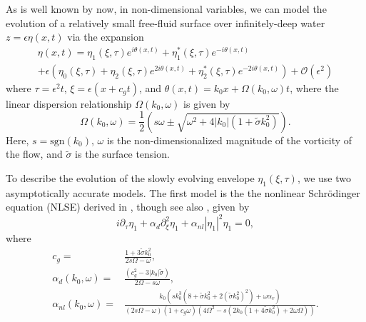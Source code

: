 \documentclass[a4paper,11pt]{article}
\newcommand{\pd}{\partial}
\begin{document}

As is well known by now, in non-dimensional variables, we can model the evolution of a relatively small free-fluid surface over infinitely-deep water $z=\epsilon \eta(x,t)$ via the expansion 
\begin{multline*}
\eta(x,t) = \eta_{1}(\xi,\tau)e^{i\theta(x,t)} + \eta^{\ast}_{1}(\xi,\tau)e^{-i\theta(x,t)}\\
+ \epsilon\left(\eta_{0}(\xi,\tau) + \eta_{2}(\xi,\tau)e^{2i\theta(x,t)} + \eta^{\ast}_{2}(\xi,\tau)e^{-2i\theta(x,t)}\right) + \mathcal{O}\left(\epsilon^{2} \right)
\end{multline*}
where $\tau = \epsilon^{2}t$, $\xi = \epsilon(x+c_{g}t)$, and $\theta(x,t) = k_{0}x + \Omega(k_{0},\omega)t$, where the linear dispersion relationship $\Omega(k_{0},\omega)$ is given by
\[
\Omega(k_{0},\omega) = \frac{1}{2}\left(s\omega \pm \sqrt{\omega^{2} + 4|k_{0}|\left(1+\tilde{\sigma}k_{0}^{2}\right)} \right).
\]
Here, $s = \mbox{sgn}(k_{0})$, $\omega$ is the non-dimensionalized magnitude of the vorticity of the flow, and $\tilde{\sigma}$ is the surface tension.  

To describe the evolution of the slowly evolving envelope $\eta_{1}(\xi,\tau)$, we use two asymptotically accurate models.  The first model is the the nonlinear Schr\"{o}dinger equation (NLSE) derived in \cite{curtis8}, though see also \cite{thomas2012nonlinear}, given by 
\[
i\pd_{\tau}\eta_{1} + \alpha_{d}\pd_{\xi}^{2}\eta_{1} + \alpha_{nl}\left|\eta_{1} \right|^{2}\eta_{1} = 0, 
\]
where 
\begin{align*}
c_{g} = & \frac{1+3\tilde{\sigma}k_{0}^{2}}{2s\Omega - \omega},\\
\alpha_{d}(k_{0},\omega) = & \frac{(c^2_{g} - 3|k_{0}|\tilde{\sigma})}{2\Omega-s\omega},\\
\alpha_{nl}(k_{0},\omega) = & \frac{k_{0}\left( sk_{0}^{3}\left(8 + \tilde{\sigma}k_{0}^{2} + 2(\tilde{\sigma}k_{0}^{2})^{2}\right) + \omega \alpha_{v}\right)}{\left(2s\Omega -\omega\right)(1+c_{g}\omega)\left(4\Omega^2-s(2k_{0}(1+4\tilde{\sigma}k_{0}^{2})+2\omega\Omega)\right)}.
\end{align*}
\end{document}
